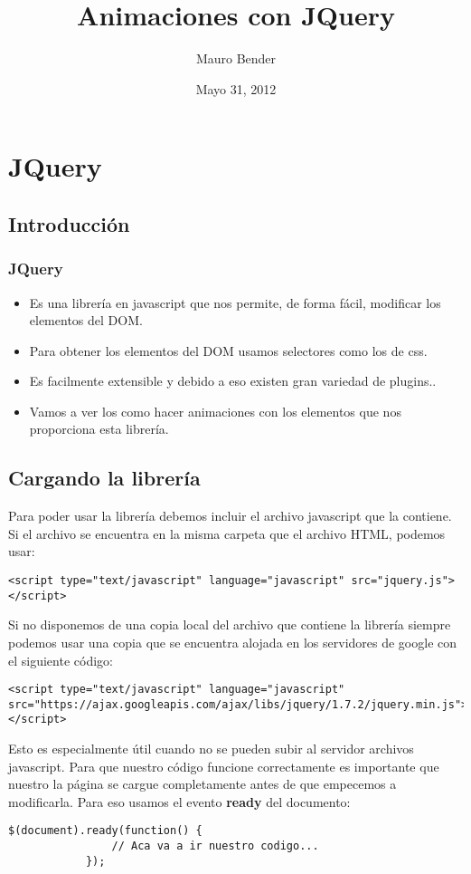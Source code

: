 \documentclass[10pt]{beamer}
\title[Javascript - JQuery (Parte 2)]{Animaciones con JQuery}
\author{Mauro Bender}
\date{Mayo 31, 2012}
\begin{document}
\begin{frame}
\titlepage
\end{frame}

\section{JQuery}
\subsection{Introducción}
\begin{frame}[fragile]
  \frametitle{JQuery}
  \begin{itemize}
    \pause \item Es una librería en javascript que nos permite, de forma fácil, modificar los elementos del DOM.
    \pause \item Para obtener los elementos del DOM usamos selectores como los de css.
    \pause \item Es facilmente extensible y debido a eso existen gran variedad de plugins..
    \pause \item Vamos a ver los como hacer animaciones con los elementos que nos proporciona esta librería.
  \end{itemize}
\end{frame}

\subsection{Cargando la librería}
\begin{frame}[fragile]
	\pause Para poder usar la librería debemos incluir el archivo javascript que la contiene. Si el archivo 
			 se encuentra en la misma carpeta que el archivo HTML, podemos usar:
	\pause \begin{lstlisting}[html]
			<script type="text/javascript" language="javascript" src="jquery.js"></script>
		\end{lstlisting}
	\pause Si no disponemos de una copia local del archivo que contiene la librería siempre podemos usar una
			 copia que se encuentra alojada en los servidores de google con el siguiente código:
	\pause \begin{lstlisting}[html]
			<script type="text/javascript" language="javascript" src="https://ajax.googleapis.com/ajax/libs/jquery/1.7.2/jquery.min.js"></script>
		\end{lstlisting}
	\pause Esto es especialmente útil cuando no se pueden subir al servidor archivos javascript.
	\pause Para que nuestro código funcione correctamente es importante que nuestro la página se cargue completamente antes
			 de que empecemos a modificarla. Para eso usamos el evento \textbf{ready} del documento:
	\pause \begin{lstlisting}[html]
			$(document).ready(function() {
				// Aca va a ir nuestro codigo...
			});
		\end{lstlisting}
\end{frame}
\end{document}
